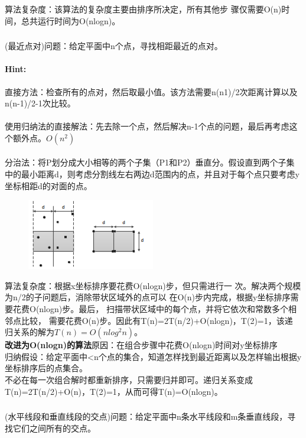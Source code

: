 \documentclass{article}
\begin{document}
   算法复杂度：该算法的复杂度主要由排序所决定，所有其他步
骤仅需要O(n)时间，总共运行时间为O(nlogn)。
     \subsubsection{}(最近点对)问题：给定平面中n个点，寻找相距最近的点对。

     \paragraph{Hint:}直接方法：检查所有的点对，然后取最小值。该方法需要n(n1)/2次距离计算以及n(n-1)/2-1次比较。\\
     \\
     使用归纳法的直接解法：先去除一个点，然后解决n-1个点的问题，最后再考虑这个额外点。$O(n^2)$\\
    \\
    分治法：将P划分成大小相等的两个子集（P1和P2）垂直分。假设直到两个子集中的最小距离d，则考虑分割线左右两边d范围内的点，并且对于每个点只要考虑y坐标相距d的对面的点。\\
      
    \begin{figure}[h]
 	\centering
 	\includegraphics[scale=0.6]{nearestpair.png}
    \end{figure}
     
    
    算法复杂度：根据x坐标排序要花费O(nlogn)步，但只需进行一
次。解决两个规模为n/2的子问题后，消除带状区域外的点可以
在O(n)步内完成，根据y坐标排序需要花费O(nlogn)步。最后，
扫描带状区域中的每个点，并将它依次和常数多个相邻点比较，
需要花费O(n)步。因此有T(n)=2T(n/2)+O(nlogn)，T(2)=1，该递
归关系的解为$T(n)=O(nlog^{2}n)$。\\
\textbf{改进为O(nlogn)的算法}原因：在组合步骤中花费O(nlogn)时间对y坐标排序\\
归纳假设：给定平面中<n个点的集合，知道怎样找到最近距离以及怎样输出根据y坐标排序后的点集合。\\
不必在每一次组合解时都重新排序，只需要归并即可。递归关系变成T(n)=2T(n/2)+O(n)，T(2)=1，从而可得T(n)=O(nlogn)。
     
     \subsubsection{}(水平线段和垂直线段的交点)问题：给定平面中n条水平线段和m条垂直线段，寻找它们之间所有的交点。
\end{document}
